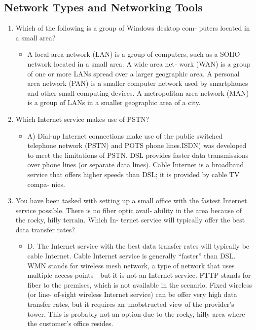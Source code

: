 \documentclass{article}
\begin{document}
\subsection{Network Types and Networking Tools} 
\begin{enumerate}
    \item Which of the following is a group of Windows desktop com‐
puters located in a small area?
    \begin{itemize}
        \item A local area network (LAN) is a group of computers, such
as a SOHO network located in a small area. A wide area net‐
work (WAN) is a group of one or more LANs spread over a
larger geographic area. A personal area network (PAN) is a
smaller computer network used by smartphones and other
small computing devices. A metropolitan area network (MAN)
is a group of LANs in a smaller geographic area of a city.
    \end{itemize}
    \item Which Internet service makes use of PSTN?
    \begin{itemize}
        \item A) Dial-up Internet connections make use of the public
switched telephone network (PSTN) and POTS phone lines.ISDN) was developed to meet the limitations of PSTN. DSL
provides faster data transmissions over phone lines (or separate
data lines). Cable Internet is a broadband service that offers
higher speeds than DSL; it is provided by cable TV compa‐
nies.
    \end{itemize}
    \item You have been tasked with setting up a small office with the
fastest Internet service possible. There is no fiber optic avail‐
ability in the area because of the rocky, hilly terrain. Which In‐
ternet service will typically offer the best data transfer rates?
    \begin{itemize}
        \item D. The Internet service with the best data transfer rates will
typically be cable Internet. Cable Internet service is generally
“faster” than DSL. WMN stands for wireless mesh network, a
type of network that uses multiple access points—but it is not
an Internet service. FTTP stands for fiber to the premises,
which is not available in the scenario. Fixed wireless (or line-
of-sight wireless Internet service) can be offer very high data
transfer rates, but it requires an unobstructed view of the
provider’s tower. This is probably not an option due to the
rocky, hilly area where the customer’s office resides.

\end{itemize}
\end{enumerate}
\end{document}
